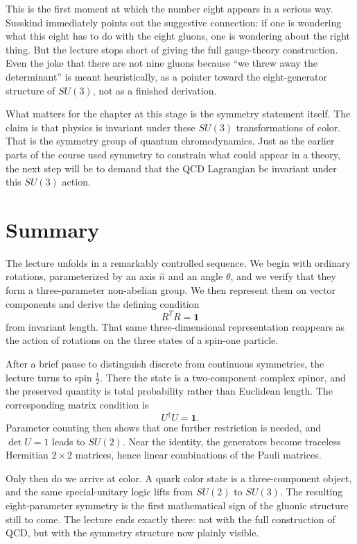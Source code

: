 This is the first moment at which the number eight appears in a serious way. Susskind immediately points out the suggestive connection: if one is wondering what this eight has to do with the eight gluons, one is wondering about the right thing. But the lecture stops short of giving the full gauge-theory construction. Even the joke that there are not nine gluons because ``we threw away the determinant'' is meant heuristically, as a pointer toward the eight-generator structure of \(SU(3)\), not as a finished derivation.

What matters for the chapter at this stage is the symmetry statement itself. The claim is that physics is invariant under these \(SU(3)\) transformations of color. That is the symmetry group of quantum chromodynamics. Just as the earlier parts of the course used symmetry to constrain what could appear in a theory, the next step will be to demand that the QCD Lagrangian be invariant under this \(SU(3)\) action.

\section{Summary}

The lecture unfolds in a remarkably controlled sequence. We begin with ordinary rotations, parameterized by an axis \(\hat n\) and an angle \(\theta\), and we verify that they form a three-parameter non-abelian group. We then represent them on vector components and derive the defining condition
\[
R^T R=\mathbf 1
\]
from invariant length. That same three-dimensional representation reappears as the action of rotations on the three states of a spin-one particle.

After a brief pause to distinguish discrete from continuous symmetries, the lecture turns to spin \(\frac12\). There the state is a two-component complex spinor, and the preserved quantity is total probability rather than Euclidean length. The corresponding matrix condition is
\[
U^\dagger U=\mathbf 1.
\]
Parameter counting then shows that one further restriction is needed, and \(\det U=1\) leads to \(SU(2)\). Near the identity, the generators become traceless Hermitian \(2\times 2\) matrices, hence linear combinations of the Pauli matrices.

Only then do we arrive at color. A quark color state is a three-component object, and the same special-unitary logic lifts from \(SU(2)\) to \(SU(3)\). The resulting eight-parameter symmetry is the first mathematical sign of the gluonic structure still to come. The lecture ends exactly there: not with the full construction of QCD, but with the symmetry structure now plainly visible.